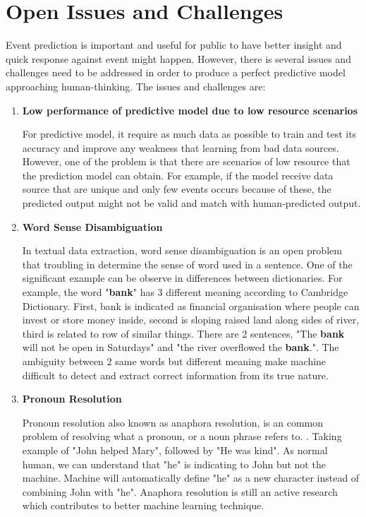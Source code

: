 \documentclass[twoside]{utmthesis}
\begin{document}
\section{Open Issues and Challenges}
Event prediction is important and useful for public to have better insight and quick response against event might happen. However, there is several issues and challenges need to be addressed in order to produce a perfect predictive model approaching human-thinking. The issues and challenges are: 
\begin{enumerate}
	

\item \textbf{Low performance of predictive model due to low resource scenarios}

For predictive model, it require as much data as possible to train and test its accuracy and improve any weakness that learning from bad data sources. However, one of the problem is that there are scenarios of low resource that the prediction model can obtain. For example, if the model receive data source that are unique and only few events occurs because of these, the predicted output might not be valid and match with human-predicted output. 

\item \textbf{Word Sense Disambiguation}

In textual data extraction, word sense disambiguation is an open problem that troubling in determine the sense of word used in a sentence. One of the significant example can be observe in differences between dictionaries. 
For example, the word "\textbf{bank}" has 3 different meaning according to Cambridge Dictionary. First, bank is indicated as financial organisation where people can invest or store money inside, second is sloping raised land along sides of river, third is related to row of similar things. There are 2 sentences, "The \textbf{bank} will not be open in Saturdays" and "the river overflowed the \textbf{bank}.". The ambiguity between 2 same words but different meaning make machine difficult to detect and extract correct information from its true nature.

\item \textbf{Pronoun Resolution}

Pronoun resolution also known as anaphora resolution, is an common problem of resolving what a pronoun, or a noun phrase refers to. \citep{poesio2016anaphora}. Taking example of "John helped Mary", followed by "He was kind". As normal human, we can understand that "he" is indicating to John but not the machine. Machine will automatically define "he" as a new character instead of combining John with "he". Anaphora resolution is still an active research \citep{choi2016coreference,bandaragoda2018text} which contributes to better machine learning technique. 

\end{enumerate}
\end{document}
